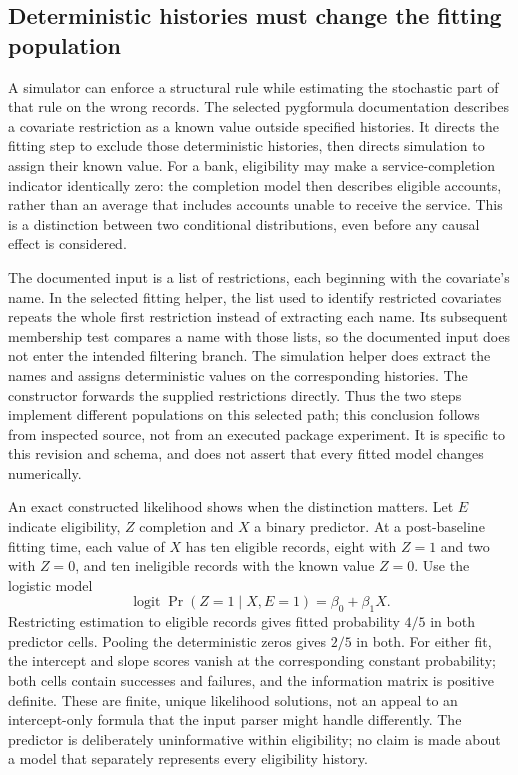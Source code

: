 \subsection{Deterministic histories must change the fitting population}
A simulator can enforce a structural rule while estimating the stochastic
part of that rule on the wrong records. The selected pygformula documentation
describes a covariate restriction as a known value outside specified histories.
It directs the fitting step to exclude those deterministic histories, then
directs simulation to assign their known value. For a bank, eligibility may
make a service-completion indicator identically zero: the completion model
then describes eligible accounts, rather than an average that includes
accounts unable to receive the service. This is a distinction between two
conditional distributions, even before any causal effect is considered.
\citep{rel25pygfit}

The documented input is a list of restrictions, each beginning with the
covariate's name. In the selected fitting helper, the list used to identify
restricted covariates repeats the whole first restriction instead of extracting
each name. Its subsequent membership test compares a name with those lists,
so the documented input does not enter the intended filtering branch.
The simulation helper does extract the names and assigns deterministic
values on the corresponding histories. The constructor forwards the supplied
restrictions directly. Thus the two steps implement different populations
on this selected path; this conclusion follows from inspected source, not
from an executed package experiment. It is specific to this revision and
schema, and does not assert that every fitted model changes numerically.
\citep{rel25pygfit}

An exact constructed likelihood shows when the distinction matters. Let
$E$ indicate eligibility, $Z$ completion and $X$ a binary predictor. At a
post-baseline fitting time, each value of $X$ has ten eligible records,
eight with $Z=1$ and two with $Z=0$, and ten ineligible records with the known
value $Z=0$. Use the logistic model
\[
 \operatorname{logit}\Pr(Z=1\mid X,E=1)=\beta_0+\beta_1X.
\]
Restricting estimation to eligible records gives fitted probability $4/5$
in both predictor cells. Pooling the deterministic zeros gives $2/5$ in both.
For either fit, the intercept and slope scores vanish at the corresponding
constant probability; both cells contain successes and failures, and the
information matrix is positive definite. These are finite, unique likelihood
solutions, not an appeal to an intercept-only formula that the input parser
might handle differently. The predictor is deliberately uninformative within
eligibility; no claim is made about a model that separately represents every
eligibility history.~\citep{rel25pygwitness}


